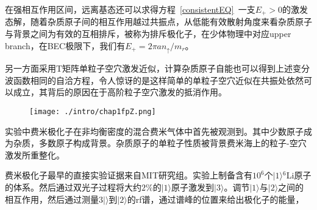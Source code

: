 在强相互作用区间，远离基态还可以求得方程~\ref{consistentEQ}~一支$E_+>0$的激发态解，随着杂质原子间的相互作用越过共振点，从低能有效散射角度来看杂质原子与背景之间为有效的互相排斥，被称为排斥极化子\cite{Cui2010Stability}，在少体物理中对应upper branch，在BEC极限下，我们有$E_{+}=2 \pi a n_{\uparrow} / m_{r}$。

另一方面采用T矩阵单粒子空穴激发近似，计算杂质原子自能也可以得到上述变分波函数相同的自洽方程\cite{Combescot20071ph}，令人惊讶的是这样简单的单粒子空穴近似在共振处依然可以成立，其背后的原因在于高阶粒子空穴激发的抵消作用\cite{Combescot20071ph008full}。
\begin{figure}[!htbp]
    \centering
    \texttt{[image: ./intro/chap1fpZ.png]}
    \label{fpZ}
\end{figure}
实验中费米极化子在非均衡密度的混合费米气体中首先被观测到。其中少数原子成为杂质，多数原子构成背景。杂质原子的单粒子性质被背景费米海上的粒子-空穴激发所重整化。

费米极化子最早的直接实验证据来自MIT研究组\cite{Schirotzekobservation}。实验上制备含有$10^6$个$|1\rangle{}^6$Li原子的体系。然后通过双光子过程将大约$2\%$的$|1\rangle$原子激发到$|3\rangle$。调节$|1\rangle$与$|2\rangle$之间的相互作用，然后通过测量$3|\rangle$到$|2\rangle$的rf谱，通过谱峰的位置来给出极化子的能量，

\begin{comment}
如图~\ref{fpE}~所示。
\begin{figure}[!htbp]
    \centering
    \texttt{[image: chap1fpE.png]}
    \bicaption{图a为实验测到的（散点）以及理论预测（黑色实线）的费米极化子能量随相互作用变化曲线。图b为rf谱峰的位置随杂质密度的变化。摘自\citep{Schirotzekobservation}}{Fig(a) for measured and predicted energy of fermi polaron upon interaction. Fig(b) for rf spectrum peak position upon impurity densuty. Reprinted from\citep{Schirotzekobservation}}
    \label{fpE}
\end{figure}
可以看到，即使在共振点处，理论计算的能量与实验测到的能量也符合很好。并且谱峰的位置受杂质密度变化影响较小，处于低密度区间。
\end{comment}

